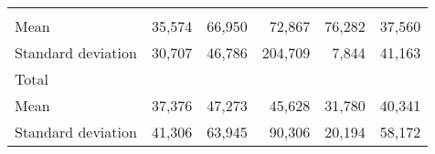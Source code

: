 \begin{tabular}{llllll}
  \multicolumn{1}{r}{} &
  \multicolumn{1}{r}{} &
  \multicolumn{1}{r}{} &
  \multicolumn{1}{r}{} \\
\multicolumn{1}{l}{\hspace{4em}Mean} &
  \multicolumn{1}{|r}{35,574} &
  \multicolumn{1}{r}{66,950} &
  \multicolumn{1}{r}{72,867} &
  \multicolumn{1}{r}{76,282} &
  \multicolumn{1}{r}{37,560} \\
\multicolumn{1}{l}{\hspace{4em}Standard deviation} &
  \multicolumn{1}{|r}{30,707} &
  \multicolumn{1}{r}{46,786} &
  \multicolumn{1}{r}{204,709} &
  \multicolumn{1}{r}{7,844} &
  \multicolumn{1}{r}{41,163} \\
\multicolumn{1}{l}{\hspace{3em}Total} &
  \multicolumn{1}{|r}{} &
  \multicolumn{1}{r}{} &
  \multicolumn{1}{r}{} &
  \multicolumn{1}{r}{} &
  \multicolumn{1}{r}{} \\
\multicolumn{1}{l}{\hspace{4em}Mean} &
  \multicolumn{1}{|r}{37,376} &
  \multicolumn{1}{r}{47,273} &
  \multicolumn{1}{r}{45,628} &
  \multicolumn{1}{r}{31,780} &
  \multicolumn{1}{r}{40,341} \\
\multicolumn{1}{l}{\hspace{4em}Standard deviation} &
  \multicolumn{1}{|r}{41,306} &
  \multicolumn{1}{r}{63,945} &
  \multicolumn{1}{r}{90,306} &
  \multicolumn{1}{r}{20,194} &
  \multicolumn{1}{r}{58,172} \\
\cline{1-6}
\end{tabular}

